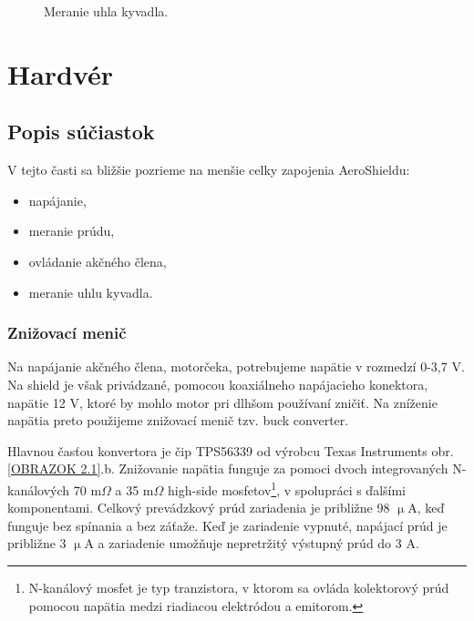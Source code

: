 \begin{figure}[!tbh]
	\hfill
	\hfill
	\hfill
	\caption{Meranie uhla kyvadla.}\label{OBRAZOK 2.1.2}
\end{figure}


\newpage
\section{Hardvér}
\subsection{Popis súčiastok}

V tejto časti sa bližšie pozrieme na menšie celky zapojenia AeroShieldu:
\begin{multicols}{2}
	\begin{itemize}
		\item napájanie,
		\item meranie prúdu,
		\item ovládanie akčného člena,
		\item meranie uhlu kyvadla.
	\end{itemize}
\end{multicols}


\subsubsection{Znižovací menič}
\label{nap}

Na napájanie akčného člena, motorčeka, potrebujeme napätie v rozmedzí 0-3,7 V. Na shield je však privádzané, pomocou koaxiálneho napájacieho konektora, napätie 12 V, ktoré by mohlo motor pri dlhšom používaní zničiť. Na zníženie napätia preto použijeme znižovací menič tzv. buck converter. 

Hlavnou časťou konvertora je čip TPS56339 od výrobcu Texas Instruments obr.\ref{OBRAZOK 2.1}.b. Znižovanie napätia funguje za pomoci dvoch integrovaných N-kanálových 70 m$\Omega$ a 35 m$\Omega$ high-side mosfetov\footnote[4]{N-kanálový mosfet je typ tranzistora, v ktorom sa ovláda kolektorový prúd pomocou napätia medzi riadiacou elektródou a emitorom.}, v spolupráci s ďalšími komponentami. Celkový prevádzkový prúd zariadenia je približne 98 $\upmu$A, keď funguje bez spínania a bez záťaže. Keď je zariadenie vypnuté, napájací prúd je približne 3 $\upmu$A a zariadenie umožňuje nepretržitý výstupný prúd do 3 A\cite{buckobr}.

